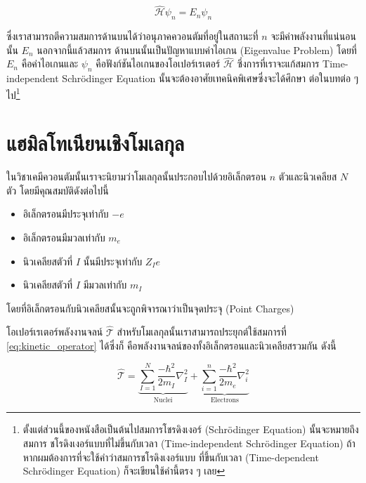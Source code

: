 \begin{equation}
    \hat{\mathscr{H}} \psi_n = E_n \psi_n
\end{equation}

\noindent ซึ่งเราสามารถตีความสมการด้านบนได้ว่าอนุภาคควอนตัมที่อยู่ในสถานะที่ $n$ จะมีค่าพลังงานที่แน่นอนนั้น $E_n$ นอกจากนี้แล้วสมการ%
ด้านบนนั้นเป็นปัญหาแบบค่าไอเกน (Eigenvalue Problem) โดยที่ $E_n$ คือค่าไอเกนและ $\psi_n$ คือฟังก์ชันไอเกนของโอเปอร์เรเตอร์ 
$\hat{\mathscr{H}}$ ซึ่งการที่เราจะแก้สมการ Time-independent Schr\"{o}dinger Equation นั้นจะต้องอาศัยเทคนิคพิเศษซึ่งจะได้ศึกษา%
ต่อในบทต่อ ๆ ไป\footnote{ตั้งแต่ส่วนนี้ของหนังสือเป็นต้นไปสมการโชรดิงเงอร์ (Schr\"{o}dinger Equation) นั้นจะหมายถึงสมการ%
ชโรดิงเงอร์แบบที่ไม่ขึ้นกับเวลา (Time-independent Schr\"{o}dinger Equation) ถ้าหากผมต้องการที่จะใช้คำว่าสมการชโรดิงเงอร์แบบ%
ที่ขึ้นกับเวลา (Time-dependent Schr\"{o}dinger Equation) ก็จะเขียนใช้คำนี้ตรง ๆ เลย}

\section{แฮมิลโทเนียนเชิงโมเลกุล}

ในวิชาเคมีควอนตัมนั้นเราจะนิยามว่าโมเลกุลนั้นประกอบไปด้วยอิเล็กตรอน $n$ ตัวและนิวเคลียส $N$ ตัว โดยมีคุณสมบัติดังต่อไปนี้

\begin{itemize}[topsep=0pt,noitemsep]
    \setlength\itemsep{1em}
    \item อิเล็กตรอนมีประจุเท่ากับ $-e$ 
    
    \item อิเล็กตรอนมีมวลเท่ากับ $m_e$ 
    
    \item นิวเคลียสตัวที่ $I$ นั้นมีประจุเท่ากับ $Z_I e$ 
    
    \item นิวเคลียสตัวที่ $I$ มีมวลเท่ากับ $m_I$ 
\end{itemize}

\noindent โดยที่อิเล็กตรอนกับนิวเคลียสนั้นจะถูกพิจารณาว่าเป็นจุดประจุ (Point Charges) 

โอเปอร์เรเตอร์พลังงานจลน์ $\hat{\mathscr{T}}$ สำหรับโมเลกุลนั้นเราสามารถประยุกต์ใช้สมการที่ \ref{eq:kinetic_operator} ได้ซึ่งก็%
คือพลังงานจลน์ของทั้งอิเล็กตรอนและนิวเคลียสรวมกัน ดังนี้

\begin{equation}
    \label{eq:kinetic_operator_molecule}
    \hat{\mathscr{T}} 
    = \underbrace{\sum_{I=1}^N \frac{-\hbar^2}{2 m_I} \nabla_I^2}_{\text{Nuclei}} 
        + \underbrace{\sum_{i=1}^n \frac{-\hbar^2}{2 m_e} \nabla_i^2}_{\text{Electrons}}
\end{equation}

